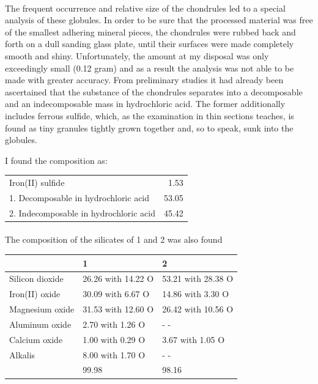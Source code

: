 \documentclass[a4paper, 12pt, oneside]{article}
\begin{document}
\paragraph*{}
The frequent occurrence and relative size of the chondrules led to a special analysis of these globules. In order to be sure that the processed material was free of the smallest adhering mineral pieces, the chondrules were rubbed back and forth on a dull sanding glass plate, until their surfaces were made completely smooth and shiny. Unfortunately, the amount at my disposal was only exceedingly small (0.12 gram) and as a result the analysis was not able to be made with greater accuracy. From preliminary studies it had already been ascertained that the substance of the chondrules separates into a decomposable and an indecomposable mass in hydrochloric acid. The former additionally includes ferrous sulfide, which, as the examination in thin sections teaches, is found as tiny granules tightly grown together and, so to speak, sunk into the globules.

I found the composition as:
\begin{center}
    \begin{tabular}{l r}
        Iron(II) sulfide & 1.53\\
        1. Decomposable in hydrochloric acid & 53.05\\
        2. Indecomposable in hydrochloric acid & 45.42\\
    \end{tabular}
\end{center}
\paragraph*{}
The composition of the silicates of 1 and 2 was also found  
\begin{center}
    \tiny
    \begin{tabular}{|p{2.0cm}|p{2.0cm}|p{2.0cm}|}
        \hline
        & 1 & 2\\\hline
        Silicon dioxide & 26.26 with 14.22 O & 53.21 with 28.38 O\\\hline
        Iron(II) oxide & 30.09 with 6.67 O & 14.86 with 3.30 O\\\hline
        Magnesium oxide & 31.53 with 12.60 O & 26.42 with 10.56 O\\\hline
        Aluminum oxide & 2.70 with 1.26 O & - -\\\hline
        Calcium oxide & 1.00 with 0.29 O & 3.67 with 1.05 O\\\hline
        Alkalis & 8.00 with 1.70 O & - -\\\hline
        & 99.98 & 98.16\\
        \hline
    \end{tabular}
\end{center}
\end{document}

